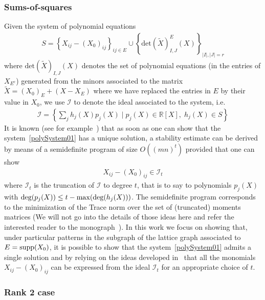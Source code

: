 \documentclass[12pt]{article}
\begin{document}
\subsubsection{Sums-of-squares}

Given the system of polynomial equations 
\begin{align}
S = \left\{X_{ij} - (X_0)_{ij}\right\}_{ij\in E}\cup \left\{\text{det}(\tilde{X})_{I,J}^{E}(X)\right\}_{|I|, |J| = r}\label{polySystem01}
\end{align} 
where $\text{det}(\tilde{X})_{I,J}( X)$ denotes the set of polynomial equations (in the entries of $X_{E^c}$) generated from the minors associated to the matrix $\tilde{X} = (X_0)_E + (X - X_E)$ where we have replaced the entries in $E$ by their value in $X_0$, we use $\mathcal{I}$ to denote the ideal associated to the system,  i.e.
\begin{align}
\mathcal{I} = \left\{\sum_{j} h_j(X) p_j(X)\;|\;p_j(X)\in \mathbb{R}[X], \; h_j(X)\in S\right\}
\end{align}
It is known (see for example~\cite{cosse2021stable}) that as soon as one can show that the system~\eqref{polySystem01} has a unique solution, a stability estimate can be derived by means of a semidefinite program of size $O((mn)^t)$ provided that one can show 
\begin{align}
X_{ij} - (X_0)_{ij} \in \mathcal{I}_t
\end{align}
where $\mathcal{I}_t$ is the truncation of $\mathcal{I}$ to degree $t$, that is to say to polynomials $p_j(X)$ with $\text{\upshape deg}(p_j(X))\leq t - \max(\text{\upshape deg}(h_j(X)))$.  The semidefinite program corresponds to the minimization of the Trace norm over the set of (truncated) moments matrices (We will not go into the details of those ideas here and refer the interested reader to the monograph~\cite{laurent2008sums}). In this work we focus on showing that, under particular patterns in the subgraph of the lattice graph associated to $E = \text{\upshape supp}(X_0)$, it is possible to show that the system~\eqref{polySystem01} admits a single solution and by relying on the ideas developed in~\cite{cosse2021stable} that all the monomials $X_{ij} - (X_0)_{ij}$ can be expressed from the ideal $\mathcal{I}_t$ for an appropriate choice of $t$. 


\subsubsection{\label{rank2caseSection}Rank 2 case}
\end{document}
